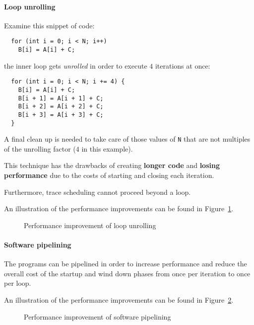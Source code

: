 \documentclass[english]{article}
\begin{document}
\paragraph{Loop unrolling}
\label{par:loop-unrolling}

Examine this snippet of code:

\begin{verbatim}
  for (int i = 0; i < N; i++)
    B[i] = A[i] + C;
\end{verbatim}

the inner loop gets \textit{unrolled} in order to execute \(4\) iterations at once:

\begin{verbatim}
  for (int i = 0; i < N; i += 4) {
    B[i] = A[i] + C;
    B[i + 1] = A[i + 1] + C;
    B[i + 2] = A[i + 2] + C;
    B[i + 3] = A[i + 3] + C;
  }
\end{verbatim}

A final clean up is needed to take care of those values of \texttt{N} that are not multiples of the unrolling factor (\(4\) in this example).

This technique has the drawbacks of creating \textbf{longer code} and \textbf{losing performance} due to the costs of starting and closing each iteration.

Furthermore, trace scheduling cannot proceed beyond a loop.

\bigskip
An illustration of the performance improvements can be found in Figure~\ref{fig:performance-improvement-loop-unrolling}.

\begin{figure}[htbp]
  \bigskip
  \centering
  \caption{Performance improvement of loop unrolling}
  \label{fig:performance-improvement-loop-unrolling}
  \bigskip
\end{figure}

\paragraph{Software pipelining}
\label{par:software-pipelining}

The programs can be pipelined in order to increase performance and reduce the overall cost of the startup and wind down phases from once per iteration to once per loop.

\bigskip
An illustration of the performance improvements can be found in Figure~\ref{fig:performance-improvement-software-pipelining}.

\begin{figure}[htbp]
  \bigskip
  \centering
  \caption{Performance improvement of software pipelining}
  \label{fig:performance-improvement-software-pipelining}
  \bigskip
\end{figure}
\end{document}
